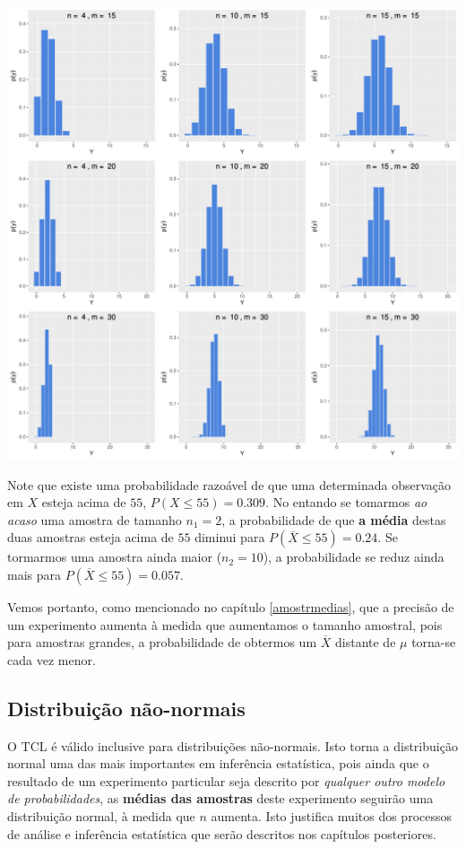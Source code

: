 \documentclass[
]{book}
\begin{document}
\begin{center}\includegraphics{probest-cambientais_files/figure-latex/unnamed-chunk-105-1} \end{center}

Note que existe uma probabilidade razoável de que uma determinada observação em \(X\) esteja acima de \(55\), \(P(X \leq 55) = 0.309\). No entando se tomarmos \emph{ao acaso} uma amostra de tamanho \(n_1 = 2\), a probabilidade de que \textbf{a média} destas duas amostras esteja acima de \(55\) diminui para \(P(\overline{X} \leq 55) = 0.24\). Se tormarmos uma amostra ainda maior (\(n_2 = 10\)), a probabilidade se reduz ainda mais para \(P(\overline{X} \leq 55) = 0.057\).

Vemos portanto, como mencionado no capítulo \ref{amostrmedias}, que a precisão de um experimento aumenta à medida que aumentamos o tamanho amostral, pois para amostras grandes, a probabilidade de obtermos um \(\overline{X}\) distante de \(\mu\) torna-se cada vez menor.

\hypertarget{distribuiuxe7uxe3o-nuxe3o-normais}{%
\subsection{Distribuição não-normais}\label{distribuiuxe7uxe3o-nuxe3o-normais}}

O TCL é válido inclusive para distribuições não-normais. Isto torna a distribuição normal uma das mais importantes em inferência estatística, pois ainda que o resultado de um experimento particular seja descrito por \emph{qualquer outro modelo de probabilidades}, as \textbf{médias das amostras} deste experimento seguirão uma distribuição normal, à medida que \(n\) aumenta. Isto justifica muitos dos processos de análise e inferência estatística que serão descritos nos capítulos posteriores.
\end{document}
